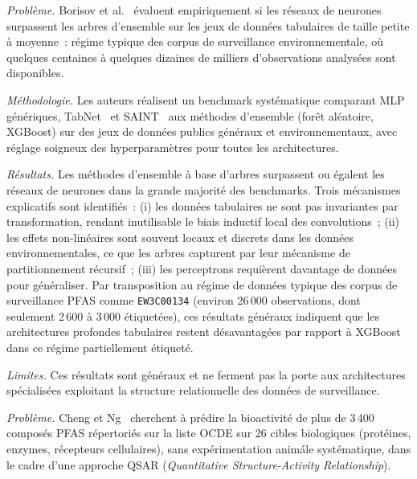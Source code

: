 \label{sec:chap2-dl}


\label{sec:art-borisov2024}

\emph{Probl\`eme.}
Borisov et al.~\cite{borisov2024tabular} \'evaluent empiriquement si les r\'eseaux de neurones surpassent les arbres d'ensemble sur les jeux de donn\'ees tabulaires de taille petite \`a moyenne~: r\'egime typique des corpus de surveillance environnementale, o\`u quelques centaines \`a quelques dizaines de milliers d'observations analys\'ees sont disponibles.

\emph{M\'ethodologie.}
Les auteurs r\'ealisent un benchmark syst\'ematique comparant MLP g\'en\'eriques, TabNet~\cite{arik2021tabnet} et SAINT~\cite{somepalli2021saint} aux m\'ethodes d'ensemble (for\^et al\'eatoire, XGBoost) sur des jeux de donn\'ees publics g\'en\'eraux et environnementaux, avec r\'eglage soigneux des hyperparam\`etres pour toutes les architectures.

\emph{R\'esultats.}
Les m\'ethodes d'ensemble \`a base d'arbres surpassent ou \'egalent les r\'eseaux de neurones dans la grande majorit\'e des benchmarks.
Trois m\'ecanismes explicatifs sont identifi\'es~: (i) les donn\'ees tabulaires ne sont pas invariantes par transformation, rendant inutilisable le biais inductif local des convolutions~; (ii) les effets non-lin\'eaires sont souvent locaux et discrets dans les donn\'ees environnementales, ce que les arbres capturent par leur m\'ecanisme de partitionnement r\'ecursif~; (iii) les perceptrons requi\`erent davantage de donn\'ees pour g\'en\'eraliser.
Par transposition au r\'egime de donn\'ees typique des corpus de surveillance PFAS comme \texttt{EW3C00134} (environ 26\,000 observations, dont seulement 2\,600 \`a 3\,000 \'etiquet\'ees), ces r\'esultats g\'en\'eraux indiquent que les architectures profondes tabulaires restent d\'esavantag\'ees par rapport \`a XGBoost dans ce r\'egime partiellement \'etiquet\'e.

\emph{Limites.}
Ces r\'esultats sont g\'en\'eraux et ne ferment pas la porte aux architectures sp\'ecialis\'ees exploitant la structure relationnelle des donn\'ees de surveillance.


\label{sec:art-cheng2019}

\emph{Probl\`eme.}
Cheng et Ng~\cite{cheng2019pfas} cherchent \`a pr\'edire la bioactivit\'e de plus de 3\,400 compos\'es PFAS r\'epertori\'es sur la liste OCDE sur 26 cibles biologiques (prot\'eines, enzymes, r\'ecepteurs cellulaires), sans exp\'erimentation anim\'ale syst\'ematique, dans le cadre d'une approche QSAR (\emph{Quantitative Structure-Activity Relationship}).

